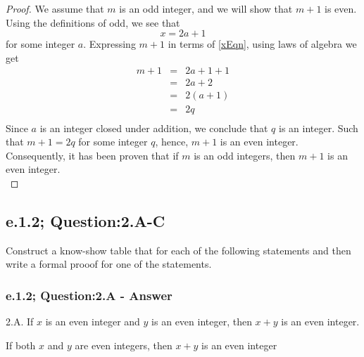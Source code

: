 \begin{proof}
We assume that $m$ is an odd integer, and  we will show that $m + 1$ is even. Using the definitions of odd, we see that
\begin{equation}
\label{xEqn}
x = 2a + 1
\end{equation}
for some integer $a$. Expressing $m+1$ in terms of \ref{xEqn}, using laws of algebra we get
\begin{eqnarray*}
m + 1 & = & 2a + 1 + 1 \nonumber \\
& = & 2a + 2 \nonumber \\
& = & 2(a + 1) \nonumber \\
& = & 2q  \nonumber \\
\end{eqnarray*}
Since $a$ is an integer closed under addition, we conclude that $q$ is an integer. Such that $m + 1 = 2q$ for some integer $q$, hence, $m + 1$ is an even integer. Consequently, it has been proven that if $m$ is an odd integers, then $m+1$ is an even integer. \\
\end{proof}



\subsection{e.1.2; Question:2.A-C}
Construct a know-show table that for each of the following statements and then write a formal prooof for one of the statements. \\

\subsubsection*{e.1.2; Question:2.A - Answer}
2.A. If $x$ is an even integer and $y$ is an even integer, then $x + y$ is an even integer. \\ 

\begin{tcolorbox}
\begin{theorem}
If both $x$ and $y$ are even integers, then $x + y$ is an even integer
\end{theorem}
\end{tcolorbox}

